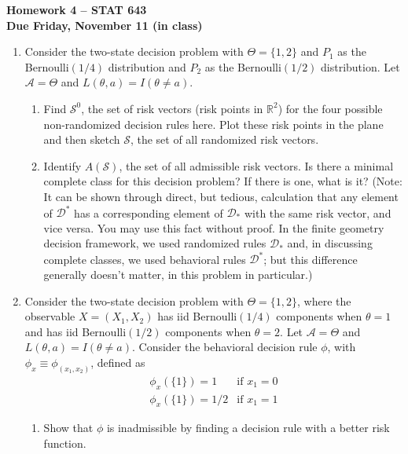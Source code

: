 \documentclass[11pt]{article}
\begin{document}
\vspace{6cm}
\begin{center}\Large \textbf{Homework 4 -- STAT 643} \\
\normalsize \textbf{Due Friday, November 11 (in class)}
\end{center}

\begin{enumerate} \itemsep .3cm
\item Consider the two-state decision problem with $\Theta=\{1,2\}$ and $P_1$ as the Bernoulli$(1/4)$ distribution and
$P_2$ as the Bernoulli$(1/2)$ distribution. Let $\mathcal{A}=\Theta$ and $L(\theta,a)=I(\theta \neq a)$.
\begin{enumerate}
\item Find $\mathcal{S}^0$, the set of risk vectors (risk points in $\mathbb{R}^2$) for the four possible non-randomized decision rules here.  Plot these risk points in the plane and then sketch $\mathcal{S}$, the set of all randomized risk vectors.
    \item Identify $A(\mathcal{S})$, the set of all admissible risk vectors.  Is there a minimal complete class for this decision problem? If there is one, what is it?  (Note: It can be shown through direct, but tedious, calculation that any element of $\mathcal{D}^*$ has a corresponding element of $\mathcal{D}_*$ with the same risk vector, and vice versa.  You may use this fact without proof. In the finite geometry decision framework, we used randomized rules $\mathcal{D}_*$ and, in discussing complete classes, we used behavioral rules $\mathcal{D}^*$; but this difference generally doesn't matter, in this problem in particular.)

         \end{enumerate}
         \item Consider the two-state decision problem with $\Theta=\{1,2\}$, where the observable $X=(X_1,X_2)$ has iid Bernoulli$(1/4)$
         components when $\theta=1$ and  has iid Bernoulli$(1/2)$
         components when $\theta=2$. Let $\mathcal{A}=\Theta$ and $L(\theta,a)=I(\theta \neq a)$.  Consider the behavioral decision rule $\phi$, with $\phi_x\equiv \phi_{(x_1,x_2)}$, defined as
         \begin{eqnarray*}
          \phi_x(\{1\})=1 &\mbox{if $x_1=0$}\\
          \phi_x(\{1\})=1/2 &\mbox{if $x_1=1$}
         \end{eqnarray*}

\begin{enumerate}
\item Show that $\phi$ is inadmissible by finding a decision rule with a better risk function.


\end{enumerate}
\end{enumerate}
\end{document}
